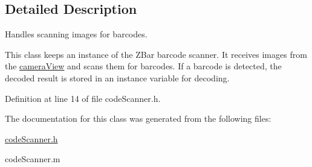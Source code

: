 \subsection{Detailed Description}
Handles scanning images for barcodes. 

This class keeps an instance of the ZBar barcode scanner. It receives images from the \hyperlink{interfacecamera_view}{cameraView} and scans them for barcodes. If a barcode is detected, the decoded result is stored in an instance variable for decoding. 

Definition at line 14 of file codeScanner.h.



The documentation for this class was generated from the following files:\begin{DoxyCompactItemize}
\item 
\hyperlink{code_scanner_8h}{codeScanner.h}\item 
codeScanner.m\end{DoxyCompactItemize}
